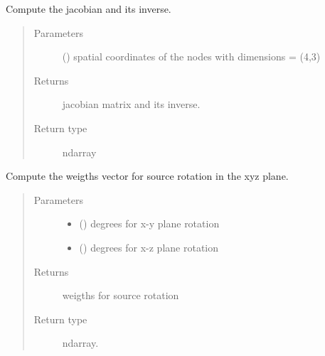 \documentclass[letterpaper,10pt,english]{sphinxmanual}
\begin{document}

\begin{fulllineitems}
\label{\detokenize{petgem/hvfem:petgem.hvfem.computeJacobian}}
Compute the jacobian and its inverse.
\begin{quote}\begin{description}
\item[{Parameters}] \leavevmode
{} () \textendash{} spatial coordinates of the nodes with dimensions = (4,3)

\item[{Returns}] \leavevmode
jacobian matrix and its inverse.

\item[{Return type}] \leavevmode
ndarray

\end{description}\end{quote}

\end{fulllineitems}


\begin{fulllineitems}
\label{\detokenize{petgem/hvfem:petgem.hvfem.computeSourceVectorRotation}}
Compute the weigths vector for source rotation in the xyz plane.
\begin{quote}\begin{description}
\item[{Parameters}] \leavevmode\begin{itemize}
\item {} 
 () \textendash{} degrees for x-y plane rotation

\item {} 
 () \textendash{} degrees for x-z plane rotation

\end{itemize}

\item[{Returns}] \leavevmode
weigths for source rotation

\item[{Return type}] \leavevmode
ndarray.

\end{description}\end{quote}

\end{fulllineitems}
\end{document}
